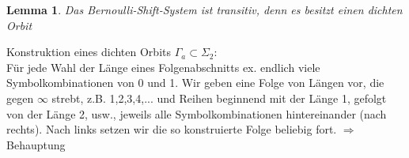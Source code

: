 \documentclass[a4paper, 13pt]{scrreprt}
\newtheorem{lemma}[theorem]{Lemma}
\theoremstyle{definition} \newtheorem{definition}{Definition}[section]
\newenvironment{beweis}[1][Beweis]{\begin{trivlist}
\item[\hskip \labelsep {\bfseries #1}]}{\end{trivlist}}
\begin{document}
\begin{lemma}
Das Bernoulli-Shift-System ist transitiv, denn es besitzt einen dichten Orbit
\end{lemma}
\begin{beweis}
Konstruktion eines dichten Orbits \(\Gamma_a \subset \Sigma_2\): \\
Für jede Wahl der Länge eines Folgenabschnitts ex. endlich viele Symbolkombinationen von 0 und 1. Wir geben eine Folge von Längen vor, die gegen \(\infty\) strebt, z.B. 1,2,3,4,... und Reihen beginnend mit der Länge 1, gefolgt von der Länge 2, usw., jeweils alle Symbolkombinationen hintereinander (nach rechts). Nach links setzen wir die so konstruierte Folge beliebig fort. \(\Rightarrow\) Behauptung
\end{beweis}
\end{document}
